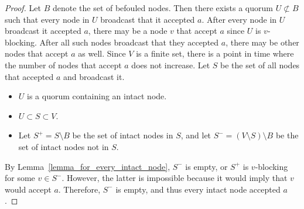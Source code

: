 \documentclass[12pt, psamsfonts]{amsart}
\theoremstyle{definition}
\theoremstyle{remark}
\numberwithin{equation}{section}
\begin{document}
\begin{proof}
    Let $B$ denote the set of befouled nodes.
    Then there exists a quorum $U \not\subset B$ such that every node in $U$ broadcast that it accepted $a$.
    After every node in $U$ broadcast it accepted $a$, there may be a node $v$ that accept $a$ since $U$ is $v$-blocking.
    After all such nodes broadcast that they accepted $a$, there may be other nodes that accept $a$ as well.
    Since $V$ is a finite set, there is a point in time where the number of nodes that accept $a$ does not increase.
    Let $S$ be the set of all nodes that accepted $a$ and broadcast it.
    \begin{itemize}
        \item
            $U$ is a quorum containing an intact node.
        \item
            $U \subset S \subset V$.
        \item
            Let $S^{+} = S \setminus B$ be the set of intact nodes in $S$, and let $S^{-} = (V \setminus S) \setminus B$ be the set of intact nodes not in $S$.
    \end{itemize}
    By Lemma~\ref{lemma_for_every_intact_node}, $S^{-}$ is empty, or $S^{+}$ is $v$-blocking for some $v \in S^{-}$.
    However, the latter is impossible because it would imply that $v$ would accept $a$.
    Therefore, $S^{-}$ is empty, and thus every intact node accepted $a$.
\end{proof}
\end{document}
